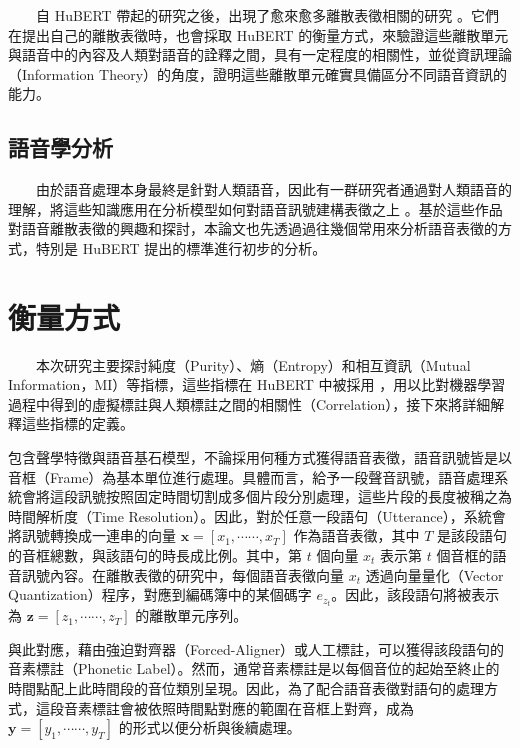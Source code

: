 {　　自 HuBERT 帶起的研究之後，出現了愈來愈多離散表徵相關的研究\cite{10097097, abdullah23_interspeech, chang_exploration_2023, liu2024dinosr, zhang2024speechtokenizer, huang2023repcodec} 。它們在提出自己的離散表徵時，也會採取 HuBERT 的衡量方式，來驗證這些離散單元與語音中的內容及人類對語音的詮釋之間，具有一定程度的相關性，並從資訊理論（Information Theory）的角度，證明這些離散單元確實具備區分不同語音資訊的能力。

\subsection{語音學分析}

　　由於語音處理本身最終是針對人類語音，因此有一群研究者通過對人類語音的理解，將這些知識應用在分析模型如何對語音訊號建構表徵之上\cite{deseyssel22_interspeech, wells_phonetic_2022, 10097097, abdullah23_interspeech} 。基於這些作品對語音離散表徵的興趣和探討，本論文也先透過過往幾個常用來分析語音表徵的方式，特別是 HuBERT \cite{hsu_hubert_2021-2} 提出的標準進行初步的分析。


\section{衡量方式}

　　本次研究主要探討純度（Purity）、熵（Entropy）和相互資訊（Mutual Information，MI）等指標，這些指標在 HuBERT 中被採用 \cite{hsu_hubert_2021, hsu_hubert_2021-2}，用以比對機器學習過程中得到的虛擬標註與人類標註之間的相關性（Correlation），接下來將詳細解釋這些指標的定義。

        包含聲學特徵與語音基石模型，不論採用何種方式獲得語音表徵，語音訊號皆是以音框（Frame）為基本單位進行處理。具體而言，給予一段聲音訊號，語音處理系統會將這段訊號按照固定時間切割成多個片段分別處理，這些片段的長度被稱之為時間解析度（Time Resolution）。因此，對於任意一段語句（Utterance），系統會將訊號轉換成一連串的向量 $\boldsymbol{x} = [x_1, \cdots\cdots, x_T]$ 作為語音表徵，其中 $T$ 是該段語句的音框總數，與該語句的時長成比例。其中，第 $t$ 個向量 \(x_t\) 表示第 $t$ 個音框的語音訊號內容。在離散表徵的研究中，每個語音表徵向量 $x_t$ 透過向量量化（Vector Quantization）程序，對應到編碼簿中的某個碼字 $e_{z_t}$。因此，該段語句將被表示為 $\boldsymbol{z} = [z_1, \cdots\cdots, z_T]$ 的離散單元序列。

        與此對應，藉由強迫對齊器（Forced-Aligner）或人工標註，可以獲得該段語句的音素標註（Phonetic Label）。然而，通常音素標註是以每個音位的起始至終止的時間點配上此時間段的音位類別呈現。因此，為了配合語音表徵對語句的處理方式，這段音素標註會被依照時間點對應的範圍在音框上對齊，成為 $\boldsymbol{y} = [y_1, \cdots\cdots, y_T]$ 的形式以便分析與後續處理。

}
